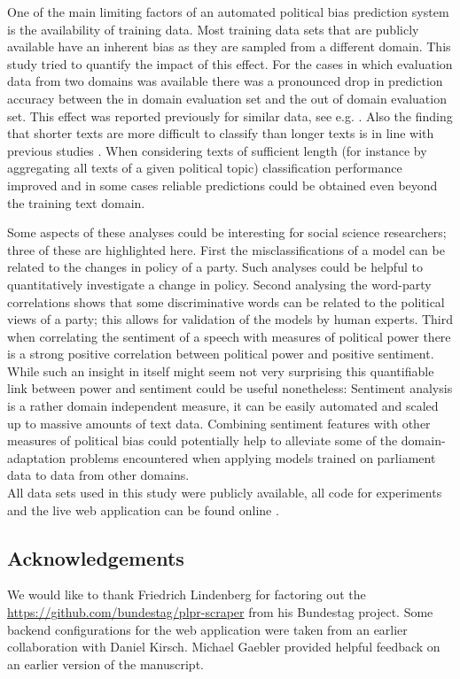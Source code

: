 \documentclass{article}
\begin{document}
One of the main limiting factors of an automated political bias prediction system is the availability of training data. Most training data sets that are publicly available have an inherent bias as they are sampled from a different domain. This study tried to quantify the impact of this effect.
For the cases in which evaluation data from two domains was available there was a pronounced drop in prediction accuracy between the in domain evaluation set and the out of domain evaluation set. This effect was reported previously for similar data, see e.g. \cite{Yu2008}. Also the finding that shorter texts are more difficult to classify than longer texts is in line with previous studies \cite{Hirst2014}. When considering texts of sufficient length (for instance by aggregating all texts of a given political topic) classification performance improved and in some cases reliable predictions could be obtained even beyond the training text domain.

Some aspects of these analyses could be interesting for social science researchers; three of these are highlighted here.
First the misclassifications of a model can be related to the changes in policy of a party. Such analyses could be helpful to quantitatively investigate a change in policy. Second analysing the word-party correlations shows that some discriminative words can be related to the political views of a party; this allows for validation of the models by human experts. Third when correlating the sentiment of a speech with measures of political power there is a strong positive correlation between political power and positive sentiment. While such an insight in itself might seem not very surprising this quantifiable link between power and sentiment could be useful nonetheless: Sentiment analysis is a rather domain independent measure, it can be easily automated and scaled up to massive amounts of text data. Combining sentiment features with other measures of political bias could potentially help to alleviate some of the domain-adaptation problems encountered when applying models trained on parliament data to data from other domains. \\


All data sets used in this study were publicly available, all code for experiments and the live web application can be found online \cite{fipi, fipidemo}.

\subsection*{Acknowledgements}
We would like to thank Friedrich Lindenberg for factoring out the \url{https://github.com/bundestag/plpr-scraper} from his Bundestag project. Some backend configurations for the web application were taken from an earlier collaboration with Daniel Kirsch. Michael Gaebler provided helpful feedback on an earlier version of the manuscript. 
%
\small{


}
\end{document}
